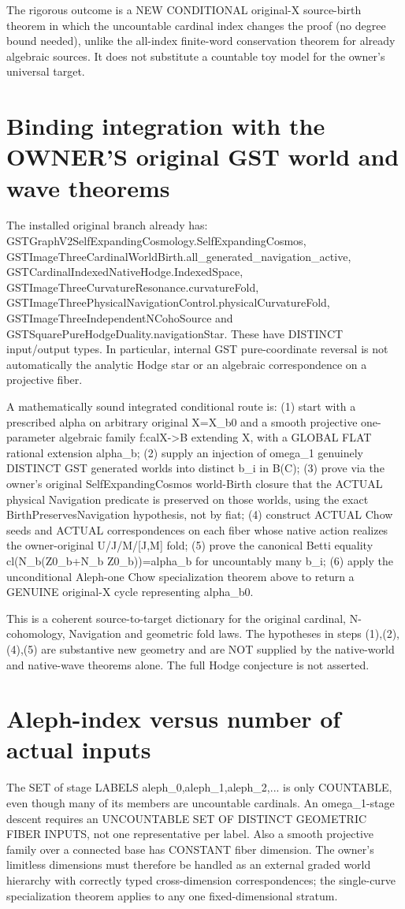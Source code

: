 \documentclass[11pt]{article}
\begin{document}
The rigorous outcome is a NEW CONDITIONAL
original-X source-birth theorem in which
the uncountable cardinal index changes the
proof (no degree bound needed), unlike
the all-index finite-word conservation
theorem for already algebraic sources.
It does not substitute a countable
toy model for the owner's universal target.


\section{Binding integration with the OWNER'S original GST world and wave theorems}
The installed original branch already has:
GSTGraphV2SelfExpandingCosmology.SelfExpandingCosmos,
GSTImageThreeCardinalWorldBirth.all_generated_navigation_active,
GSTCardinalIndexedNativeHodge.IndexedSpace,
GSTImageThreeCurvatureResonance.curvatureFold,
GSTImageThreePhysicalNavigationControl.physicalCurvatureFold,
GSTImageThreeIndependentNCohoSource and
GSTSquarePureHodgeDuality.navigationStar.
These have DISTINCT input/output types.
In particular, internal GST pure-coordinate reversal
is not automatically the analytic Hodge star or an
algebraic correspondence on a projective fiber.

A mathematically sound integrated conditional route is:
(1) start with a prescribed alpha on arbitrary original
X=X_b0 and a smooth projective one-parameter algebraic
family f:calX->B extending X, with a GLOBAL FLAT
rational extension alpha_b;
(2) supply an injection of omega_1 genuinely DISTINCT
GST generated worlds into distinct b_i in B(C);
(3) prove via the owner's original
SelfExpandingCosmos world-Birth closure that
the ACTUAL physical Navigation predicate is
preserved on those worlds, using the exact
BirthPreservesNavigation hypothesis, not by fiat;
(4) construct ACTUAL Chow seeds and ACTUAL
correspondences on each fiber whose native action
realizes the owner-original U/J/M/[J,M] fold;
(5) prove the canonical Betti equality
cl(N_b(Z0_b+N_b Z0_b))=alpha_b
for uncountably many b_i;
(6) apply the unconditional Aleph-one Chow
specialization theorem above to return a GENUINE
original-X cycle representing alpha_b0.

This is a coherent source-to-target dictionary
for the original cardinal, N-cohomology, Navigation
and geometric fold laws. The hypotheses in
steps (1),(2),(4),(5) are substantive new geometry
and are NOT supplied by the native-world and
native-wave theorems alone.
The full Hodge conjecture is not asserted.

\section{Aleph-index versus number of actual inputs}
The SET of stage LABELS
{aleph_0,aleph_1,aleph_2,...} is only COUNTABLE,
even though many of its members are
uncountable cardinals.
An omega_1-stage descent requires an
UNCOUNTABLE SET OF DISTINCT GEOMETRIC FIBER
INPUTS, not one representative per label.
Also a smooth projective family over a
connected base has CONSTANT fiber dimension.
The owner's limitless dimensions must
therefore be handled as an external graded
world hierarchy with correctly typed
cross-dimension correspondences; the
single-curve specialization theorem applies
to any one fixed-dimensional stratum.
\end{document}
